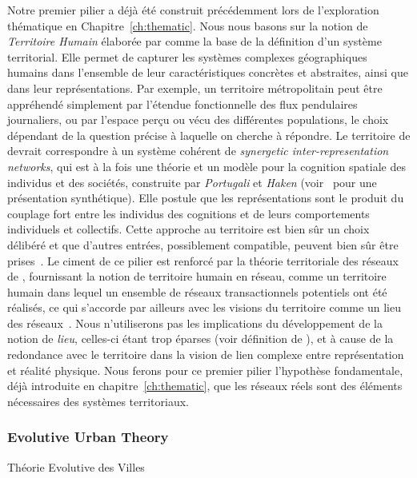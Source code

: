 {Notre premier pilier a déjà été construit précédemment lors de l'exploration thématique en Chapitre~\ref{ch:thematic}. Nous nous basons sur la notion de \emph{Territoire Humain} élaborée par  comme la base de la définition d'un système territorial. Elle permet de capturer les systèmes complexes géographiques humains dans l'ensemble de leur caractéristiques concrètes et abstraites, ainsi que dans leur représentations. Par exemple, un territoire métropolitain peut être appréhendé simplement par l'étendue fonctionnelle des flux pendulaires journaliers, ou par l'espace perçu ou vécu des différentes populations, le choix dépendant de la question précise à laquelle on cherche à répondre. Le territoire de  devrait correspondre à un système cohérent de \emph{synergetic inter-representation networks}, qui est à la fois une théorie et un modèle pour la cognition spatiale des individus et des sociétés, construite par \emph{Portugali} et \emph{Haken} (voir~\cite{portugali2011sirn} pour une présentation synthétique). Elle postule que les représentations sont le produit du couplage fort entre les individus des cognitions et de leurs comportements individuels et collectifs. Cette approche au territoire est bien sûr un choix délibéré et que d'autres entrées, possiblement compatible, peuvent bien sûr être prises~\cite{murphy2012entente}. Le ciment de ce pilier est renforcé par la théorie territoriale des réseaux de , fournissant la notion de territoire humain en réseau, comme un territoire humain dans lequel un ensemble de réseaux transactionnels potentiels ont été réalisés, ce qui s'accorde par ailleurs avec les visions du territoire comme un lieu des réseaux~\cite{champollion:halshs-00999026}. Nous n'utiliserons pas les implications du développement de la notion de \emph{lieu}, celles-ci étant trop éparses (voir définition de \cite{hypergeo}), et à cause de la redondance avec le territoire dans la vision de lien complexe entre représentation et réalité physique. Nous ferons pour ce premier pilier l'hypothèse fondamentale, déjà introduite en chapitre~\ref{ch:thematic}, que les réseaux réels sont des éléments nécessaires des systèmes territoriaux.
}



\subsubsection{Evolutive Urban Theory}{Théorie Evolutive des Villes}



